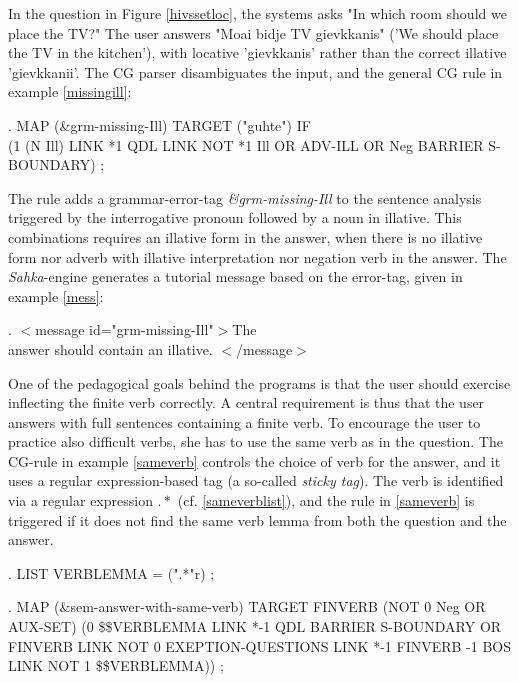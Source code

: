 \documentclass[11pt]{article}
\begin{document}
In the question in Figure \ref{hivssetloc}, the systems asks "In which room should we place the TV?" The user answers "Moai bidje TV gievkkanis" ('We should place the TV in the kitchen'), with locative 'gievkkanis' rather than the correct illative 'gievkkanii'. The CG parser disambiguates the input, and the general CG rule in example \ref{missingill}: 

\ex.\flushleft\label{missingill} \small{MAP (\&grm-missing-Ill) TARGET ("guhte") IF \\(1 (N Ill) LINK *1 QDL LINK NOT *1 Ill OR ADV-ILL OR Neg BARRIER S-BOUNDARY) ;}

The rule adds a grammar-error-tag \textit{\&grm-missing-Ill} to the sentence analysis triggered by the interrogative pronoun followed by a noun in illative. This combinations requires an illative form in the answer, when there is no illative form nor adverb with illative interpretation nor negation verb in the answer. The \textit{Sahka}-engine generates a tutorial message based on the error-tag, given in example \ref{mess}:  

\ex.\label{mess} \small{$<$message id="grm-missing-Ill"$>$The \\answer should contain an illative. $<$/message$>$}


One of the pedagogical goals behind the programs is that the user should exercise inflecting the finite verb correctly. A central requirement is thus that the user answers with full sentences containing a finite verb. To encourage the user to practice also difficult verbs, she has to use the same verb as in the question. The CG-rule in example \ref{sameverb} controls the choice of verb for the answer, and it uses a regular expression-based tag (a so-called \textit{sticky tag}). The verb is identified via a regular expression $.*$ (cf. \ref{sameverblist}), and the rule in \ref{sameverb} is triggered if it does not find the same verb lemma from both the question and the answer.

\ex.\flushleft\label{sameverblist} \small{LIST VERBLEMMA = (".*"r) ;}

\ex.\flushleft\label{sameverb} \small{MAP (\&sem-answer-with-same-verb) TARGET FINVERB (NOT 0 Neg OR AUX-SET) (0 \$\$VERBLEMMA LINK *-1 QDL BARRIER S-BOUNDARY OR FINVERB LINK NOT 0 EXEPTION-QUESTIONS LINK *-1 FINVERB -1 BOS LINK NOT 1 \$\$VERBLEMMA)) ;}
\end{document}
